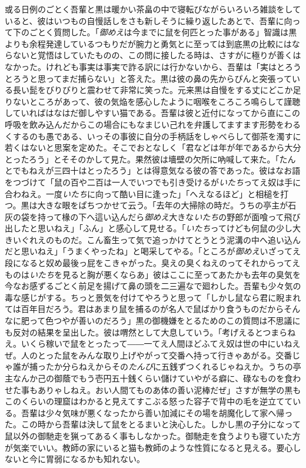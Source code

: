 \documentclass[12pt, openright]{book}
\begin{document}
或る日例のごとく吾輩と黒は暖かい茶畠の中で寝転びながらいろいろ雑談をしていると、彼はいつもの自慢話しをさも新しそうに繰り返したあとで、吾輩に向って下のごとく質問した。「\emph{御めえ}は今までに鼠を何匹とった事がある」智識は黒よりも余程発達しているつもりだが腕力と勇気とに至っては到底黒の比較にはならないと覚悟はしていたものの、この問に接したる時は、さすがに極りが善くはなかった。けれども事実は事実で詐る訳には行かないから、吾輩は「実はとろうとろうと思ってまだ捕らない」と答えた。黒は彼の鼻の先からぴんと突張っている長い髭をびりびりと震わせて非常に笑った。元来黒は自慢をする丈にどこか足りないところがあって、彼の気焔を感心したように咽喉をころころ鳴らして謹聴していればはなはだ御しやすい猫である。吾輩は彼と近付になってから直にこの呼吸を飲み込んだからこの場合にもなまじい己れを弁護してますます形勢をわるくするのも愚である、いっその事彼に自分の手柄話をしゃべらして御茶を濁すに若くはないと思案を定めた。そこでおとなしく「君などは年が年であるから大分とったろう」とそそのかして見た。果然彼は墻壁の欠所に吶喊して来た。「たんとでもねえが三四十はとったろう」とは得意気なる彼の答であった。彼はなお語をつづけて「鼠の百や二百は一人でいつでも引き受けるが\emph{いたち}ってえ奴は手に合わねえ。一度\emph{いたち}に向って酷い目に逢った」「へえなるほど」と相槌を打つ。黒は大きな眼をぱちつかせて云う。「去年の大掃除の時だ。うちの亭主が石灰の袋を持って椽の下へ這い込んだら\emph{御めえ}大きな\emph{いたち}の野郎が面喰って飛び出したと思いねえ」「ふん」と感心して見せる。「\emph{いたち}ってけども何鼠の少し大きいぐれえのものだ。こん畜生って気で追っかけてとうとう泥溝の中へ追い込んだと思いねえ」「うまくやったね」と喝采してやる。「ところが\emph{御めえ}いざってえ段になると奴め最後っ屁をこきゃがった。臭えの臭くねえのってそれからってえものは\emph{いたち}を見ると胸が悪くならあ」彼はここに至ってあたかも去年の臭気を今なお感ずるごとく前足を揚げて鼻の頭を二三遍なで廻わした。吾輩も少々気の毒な感じがする。ちっと景気を付けてやろうと思って「しかし鼠なら君に睨まれては百年目だろう。君はあまり鼠を捕るのが名人で鼠ばかり食うものだからそんなに肥って色つやが善いのだろう」黒の御機嫌をとるためのこの質問は不思議にも反対の結果を呈出した。彼は喟然として大息していう。「考げえるとつまらねえ。いくら稼いで鼠をとったって――一てえ人間ほどふてえ奴は世の中にいねえぜ。人のとった鼠をみんな取り上げやがって交番へ持って行きゃあがる。交番じゃ誰が捕ったか分らねえからその\emph{たんび}に五銭ずつくれるじゃねえか。うちの亭主なんか己の御蔭でもう壱円五十銭くらい儲けていやがる癖に、碌なものを食わせた事もありゃしねえ。おい人間てものあ体の善い泥棒だぜ」さすが無学の黒もこのくらいの理窟はわかると見えてすこぶる怒った容子で背中の毛を逆立てている。吾輩は少々気味が悪くなったから善い加減にその場を胡魔化して家へ帰った。この時から吾輩は決して鼠をとるまいと決心した。しかし黒の子分になって鼠以外の御馳走を猟ってあるく事もしなかった。御馳走を食うよりも寝ていた方が気楽でいい。教師の家にいると猫も教師のような性質になると見える。要心しないと今に胃弱になるかも知れない。
\end{document}
